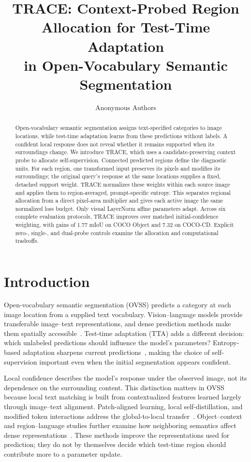 \documentclass[letterpaper]{article}
\title{TRACE: Context-Probed Region Allocation for Test-Time Adaptation\\in Open-Vocabulary Semantic Segmentation}
\author{Anonymous Authors}
\begin{document}
\raggedbottom
\maketitle

\begin{abstract}
Open-vocabulary semantic segmentation assigns text-specified categories to image locations, while test-time adaptation learns from these predictions without labels. A confident local response does not reveal whether it remains supported when its surroundings change. We introduce TRACE, which uses a candidate-preserving context probe to allocate self-supervision. Connected predicted regions define the diagnostic units. For each region, one transformed input preserves its pixels and modifies its surroundings; the original query's response at the same locations supplies a fixed, detached support weight. TRACE normalizes these weights within each source image and applies them to region-averaged, prompt-specific entropy. This separates regional allocation from a direct pixel-area multiplier and gives each active image the same normalized loss budget. Only visual LayerNorm affine parameters adapt. Across six complete evaluation protocols, TRACE improves over matched initial-confidence weighting, with gains of 1.77 mIoU on COCO Object and 7.32 on COCO-CD. Explicit zero-, single-, and dual-probe controls examine the allocation and computational tradeoffs.
\end{abstract}

\section{Introduction}
Open-vocabulary semantic segmentation (OVSS) predicts a category at each image location from a supplied text vocabulary. Vision--language models provide transferable image--text representations, and dense prediction methods make them spatially accessible~\cite{radford2021clip,hajimiri2025naclip}. Test-time adaptation (TTA) adds a different decision: which unlabeled predictions should influence the model's parameters? Entropy-based adaptation sharpens current predictions~\cite{wang2021tent,noori2025mlmp}, making the choice of self-supervision important even when the initial segmentation appears confident.

Local confidence describes the model's response under the observed image, not its dependence on the surrounding content. This distinction matters in OVSS because local text matching is built from contextualized features learned largely through image--text alignment. Patch-aligned learning, local self-distillation, and modified token interactions address the global-to-local transfer~\cite{mukhoti2023pacl,wu2024clipself,shao2024cliptrase}. Object--context and region--language studies further examine how neighboring semantics affect dense representations~\cite{kim2025cass,li2025densevlm}. These methods improve the representations used for prediction; they do not by themselves decide which test-time region should contribute more to a parameter update.
\end{document}
